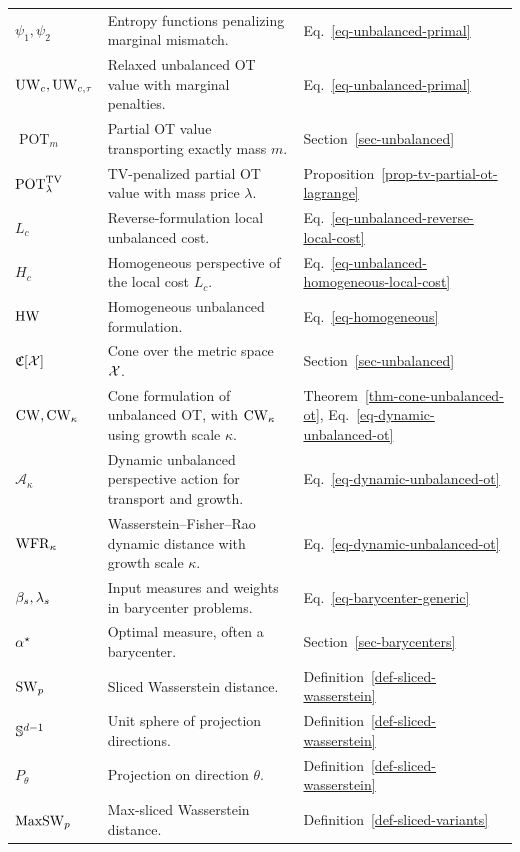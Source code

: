 {\begin{longtable}{>{\raggedright\arraybackslash}p{}
                  >{\raggedright\arraybackslash}p{}
                  >{\raggedright\arraybackslash}p{}}
\hline
\multicolumn{3}{l}{\textbf{Extensions of OT}}\\
\hline
$\psi_1,\psi_2$ & Entropy functions penalizing marginal mismatch. & Eq.~\eqref{eq-unbalanced-primal} \\
$\operatorname{UW}_c,\operatorname{UW}_{c,\tau}$ & Relaxed unbalanced OT value with marginal penalties. & Eq.~\eqref{eq-unbalanced-primal} \\
$\operatorname{POT}_m$ & Partial OT value transporting exactly mass $m$. & Section~\ref{sec-unbalanced} \\
$\operatorname{POT}^{\operatorname{TV}}_\lambda$ & TV-penalized partial OT value with mass price $\lambda$. & Proposition~\ref{prop-tv-partial-ot-lagrange} \\
$L_c$ & Reverse-formulation local unbalanced cost. & Eq.~\eqref{eq-unbalanced-reverse-local-cost} \\
$H_c$ & Homogeneous perspective of the local cost $L_c$. & Eq.~\eqref{eq-unbalanced-homogeneous-local-cost} \\
$\operatorname{HW}$ & Homogeneous unbalanced formulation. & Eq.~\eqref{eq-homogeneous} \\
$\mathfrak{C}[\mathcal{X}]$ & Cone over the metric space $\mathcal{X}$. & Section~\ref{sec-unbalanced} \\
$\operatorname{CW},\operatorname{CW}_\kappa$ & Cone formulation of unbalanced OT, with $\operatorname{CW}_\kappa$ using growth scale $\kappa$. & Theorem~\ref{thm-cone-unbalanced-ot}, Eq.~\eqref{eq-dynamic-unbalanced-ot} \\
$\mathcal A_\kappa$ & Dynamic unbalanced perspective action for transport and growth. & Eq.~\eqref{eq-dynamic-unbalanced-ot} \\
$\operatorname{WFR}_\kappa$ & Wasserstein--Fisher--Rao dynamic distance with growth scale $\kappa$. & Eq.~\eqref{eq-dynamic-unbalanced-ot} \\
$\beta_s,\lambda_s$ & Input measures and weights in barycenter problems. & Eq.~\eqref{eq-barycenter-generic} \\
$\alpha^\star$ & Optimal measure, often a barycenter. & Section~\ref{sec-barycenters} \\
$\operatorname{SW}_p$ & Sliced Wasserstein distance. & Definition~\ref{def-sliced-wasserstein} \\
$\mathbb{S}^{d-1}$ & Unit sphere of projection directions. & Definition~\ref{def-sliced-wasserstein} \\
$P_\theta$ & Projection on direction $\theta$. & Definition~\ref{def-sliced-wasserstein} \\
$\operatorname{MaxSW}_p$ & Max-sliced Wasserstein distance. & Definition~\ref{def-sliced-variants} \\

\end{longtable}}
